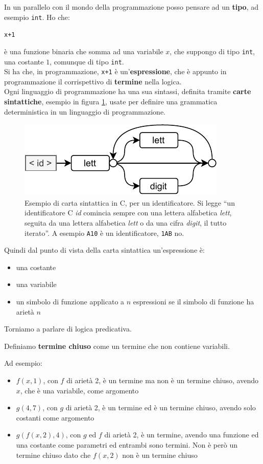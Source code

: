 \documentclass[a4paper,12pt, oneside]{book}
\begin{document}
In un parallelo con il mondo della programmazione posso pensare ad un
\textbf{tipo}, ad esempio \texttt{int}. Ho che:
\begin{center}
  \texttt{x+1}
\end{center}
è una funzione binaria che somma ad una variabile $x$, che suppongo di tipo
\texttt{int}, una costante $1$, comunque di tipo \texttt{int}.\\
Si ha che, in programmazione, \texttt{x+1} è un'\textbf{espressione}, che è
appunto in programmazione il corrispettivo di \textbf{termine} nella logica.\\
Ogni linguaggio di programmazione ha una sua sintassi, definita tramite
\textbf{carte sintattiche}, esempio in figura \ref{fig:st}, usate per definire
una grammatica deterministica in un linguaggio di programmazione.
\begin{figure}
  \centering
  \includegraphics[scale = 1.3]{img/st.pdf}
  \caption{Esempio di carta sintattica in C, per un identificatore. Si legge
    ``un identificatore C 
    \textit{id} comincia sempre con una lettera alfabetica \textit{lett},
    seguita da una lettera alfabetica \textit{lett} o da una cifra
    \textit{digit}, il tutto iterato''. A esempio \texttt{A10} è un
    identificatore, \texttt{1AB} no.} 
  \label{fig:st}
\end{figure}
Quindi dal punto di vista della carta sintattica un'espressione è:
\begin{itemize}
  \item una costante
  \item una variabile
  \item un simbolo di funzione applicato a $n$ espressioni se il simbolo di
  funzione ha arietà $n$
\end{itemize}
Torniamo a parlare di logica predicativa.
\begin{definizione}
  Definiamo \textbf{termine chiuso} come un termine che non contiene variabili.
\end{definizione}
\begin{esempio}
  Ad esempio:
  \begin{itemize}
    \item $f(x,1)$, con $f$ di arietà 2, è un termine ma non è un termine
    chiuso, avendo $x$, che è una variabile, come argomento
    \item $g(4,7)$, con $g$ di arietà 2, è un termine ed è un termine chiuso,
    avendo solo costanti come argomento
    \item $g(f(x,2),4)$, con $g$ ed $f$ di arietà 2, è un termine, avendo una
    funzione ed una costante come parametri ed entrambi sono termini. Non è però
    un termine chiuso dato che $f(x,2)$ non è un termine chiuso
  \end{itemize}
\end{esempio}
\end{document}
